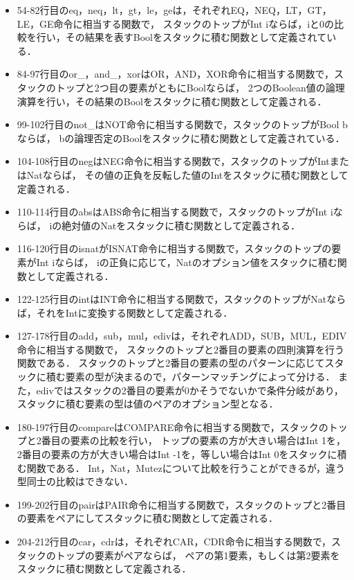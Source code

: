 \documentclass{kuisthesis}
\begin{document}
\begin{itemize}
  \item 54-82行目のeq，neq，lt，gt，le，geは，それぞれEQ，NEQ，LT，GT，LE，GE命令に相当する関数で，
  スタックのトップがInt iならば，iと0の比較を行い，その結果を表すBoolをスタックに積む関数として定義されている．
  \item 84-97行目のor\_，and\_，xorはOR，AND，XOR命令に相当する関数で，スタックのトップと2つ目の要素がともにBoolならば，
  2つのBoolean値の論理演算を行い，その結果のBoolをスタックに積む関数として定義される．
  \item 99-102行目のnot\_はNOT命令に相当する関数で，スタックのトップがBool bならば，
  bの論理否定のBoolをスタックに積む関数として定義されている．
  \item 104-108行目のnegはNEG命令に相当する関数で，スタックのトップがIntまたはNatならば，
  その値の正負を反転した値のIntをスタックに積む関数として定義される．
  \item 110-114行目のabsはABS命令に相当する関数で，スタックのトップがInt iならば，
  iの絶対値のNatをスタックに積む関数として定義される．
  \item 116-120行目のisnatがISNAT命令に相当する関数で，スタックのトップの要素がInt iならば，
  iの正負に応じて，Natのオプション値をスタックに積む関数として定義される．
  \item 122-125行目のintはINT命令に相当する関数で，スタックのトップがNatならば，それをIntに変換する関数として定義される．
  \item 127-178行目のadd，sub，mul，edivは，それぞれADD，SUB，MUL，EDIV命令に相当する関数で，
  スタックのトップと2番目の要素の四則演算を行う関数である．
  スタックのトップと2番目の要素の型のパターンに応じてスタックに積む要素の型が決まるので，パターンマッチングによって分ける．
  また，edivではスタックの2番目の要素が0かそうでないかで条件分岐があり，
  スタックに積む要素の型は値のペアのオプション型となる．
  \item 180-197行目のcompareはCOMPARE命令に相当する関数で，スタックのトップと2番目の要素の比較を行い，
  トップの要素の方が大きい場合はInt 1を，2番目の要素の方が大きい場合はInt -1を，等しい場合はInt 0をスタックに積む関数である．
  Int，Nat，Mutezについて比較を行うことができるが，違う型同士の比較はできない．
  \item 199-202行目のpairはPAIR命令に相当する関数で，スタックのトップと2番目の要素をペアにしてスタックに積む関数として定義される．
  \item 204-212行目のcar，cdrは，それぞれCAR，CDR命令に相当する関数で，スタックのトップの要素がペアならば，
  ペアの第1要素，もしくは第2要素をスタックに積む関数として定義される．

\end{itemize}
\end{document}
